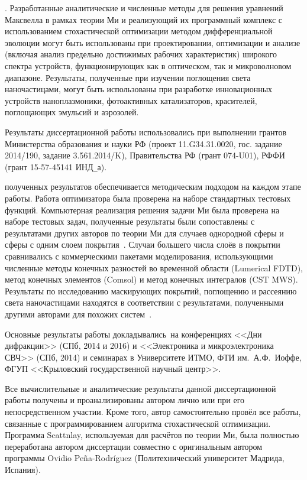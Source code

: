 {\influence}. Разработанные аналитические и численные методы для решения
уравнений Максвелла в рамках теории Ми и реализующий их
программный комплекс с использованием стохастической оптимизации
методом дифференциальной эволюции могут быть использованы при
проектировании, оптимизации и анализе (включая анализ предельно
достижимых рабочих характеристик) широкого спектра устройств,
функционирующих как в оптическом, так и микроволновом диапазоне.
Результаты, полученные при изучении поглощения света наночастицами, могут
быть использованы при разработке инновационных устройств
наноплазмоники, фотоактивных катализаторов, красителей, поглощающих
эмульсий и аэрозолей.

Результаты диссертационной работы использовались при выполнении
грантов Министерства образования и науки РФ
(проект 11.G34.31.0020, гос. задание 2014/190, задание 3.561.2014/K),
Правительства РФ (грант 074-U01), РФФИ (грант 15-57-45141 ИНД\verb+_+а).


{\reliability} полученных результатов обеспечивается методическим
подходом на каждом этапе работы. Работа оптимизатора была проверена на
наборе стандартных тестовых функций. Компьютерная реализация решения
задачи Ми была проверена на наборе тестовых задач, полученные
результаты были сопоставлены с результатами других авторов по теории
Ми для случаев однородной сферы и сферы с одним слоем
покрытия~\cite{Suzuki-2013, Bashevoy-2005}.  Случаи большего числа
слоёв в покрытии сравнивались с коммерческими пакетами моделирования,
использующими численные методы конечных разностей во временной области
(Lumerical FDTD), метод конечных элементов (Comsol) и метод конечных
интегралов (CST MWS). Результаты по исследованию маскирующих покрытий,
поглощению и рассеянию света наночастицами находятся в соответствии с
результатами, полученными другими авторами для похожих
систем~\cite{Semouchkina-2013, Alu-2014, Fan-2011}.

{\probation}
Основные результаты работы докладывались~на конференциях <<Дни
дифракции>> (СПб, 2014 и 2016) и <<Электроника и микроэлектроника СВЧ>> (СПб,
2014) и семинарах в Университете ИТМО, ФТИ им.~А.Ф.~Иоффе, ФГУП
<<Крыловский государственной научный центр>>.

{\contribution} Все вычислительные и аналитические результаты данной
диссертационной работы получены и проанализированы автором лично
 или
при его непосредственном участии.  Кроме того, автор самостоятельно
провёл все работы, связанные с программированием алгоритма
стохастической оптимизации.  Программа Scattnlay, используемая для
расчётов по теории Ми, была полностью переработана автором диссертации
совместно с оригинальным автором программы Ovidio
Pe\~{n}a-Rodr\'{i}guez (Политехнический университет Мадрида, Испания).

